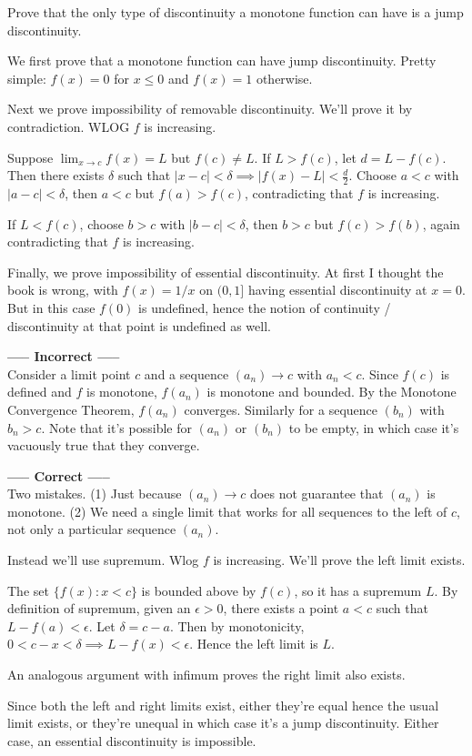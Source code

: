 \documentclass{oxmathproblems}
\begin{document}
\begin{questions}
\miquestion Prove that the only type of discontinuity a monotone function can have is a jump discontinuity.
\begin{solution}
  We first prove that a monotone function can have jump discontinuity. Pretty simple: $f(x) = 0$ for $x \leq 0$ and $f(x) = 1$ otherwise.

  Next we prove impossibility of removable discontinuity.  We'll prove it by contradiction. WLOG $f$ is increasing.
  
  Suppose $\lim_{x \to c}f(x)=L$ but $f(c) \neq L$. If $L > f(c)$, let $d=L-f(c)$. Then there exists $\delta$ such that
  $|x-c| < \delta \implies |f(x)-L| < \frac{d}{2}$. Choose $a < c$ with $|a-c| < \delta$, then $a < c$ but $f(a) > f(c)$, contradicting
  that $f$ is increasing.

  If $L < f(c)$, choose $b > c$ with $|b-c| < \delta$, then $b > c$ but $f(c) > f(b)$, again contradicting that $f$ is increasing.

  Finally, we prove impossibility of essential discontinuity. At first I thought the book is wrong, with $f(x)=1/x$ on $(0, 1]$ having
  essential discontinuity at $x=0$. But in this case $f(0)$ is undefined, hence the notion of continuity / discontinuity at that point
  is undefined as well.
  
  \textbf{----- Incorrect -----}\\
  Consider a limit point $c$ and a sequence $(a_{n}) \to c$ with $a_{n} < c$. Since $f(c)$ is defined and $f$ is monotone, $f(a_{n})$ is monotone and bounded.
  By the Monotone Convergence Theorem, $f(a_{n})$ converges. Similarly for a sequence $(b_{n})$ with $b_{n} > c$. Note that it's possible for $(a_{n})$ or $(b_{n})$
  to be empty, in which case it's vacuously true that they converge.

  \textbf{----- Correct -----}\\
  Two mistakes. (1) Just because $(a_{n}) \to c$ does not guarantee that $(a_{n})$ is monotone. (2) We need a single limit that works for all sequences to the left of $c$,
  not only a particular sequence $(a_{n})$.

  Instead we'll use supremum. Wlog $f$ is increasing. We'll prove the left limit exists.

  The set $\{f(x): x < c\}$ is bounded above by $f(c)$, so it has a supremum $L$. By definition of supremum, given an $\epsilon > 0$, there
  exists a point $a < c$ such that $L-f(a) < \epsilon$. Let $\delta =c-a$. Then by monotonicity, $0 < c-x < \delta \implies L-f(x) < \epsilon$. Hence the left limit is $L$.

  An analogous argument with infimum proves the right limit also exists.

  Since both the left and right limits exist, either they're equal hence the usual limit exists, or they're unequal in which case it's a jump discontinuity.
  Either case, an essential discontinuity is impossible.
\end{solution}

\end{questions}
\end{document}

